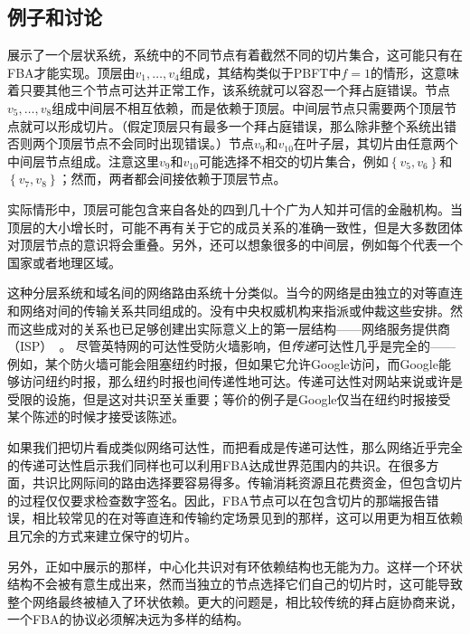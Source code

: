 \subsection{例子和讨论}\label{sec:fba_eg_disscuss}
展示了一个层状系统，系统中的不同节点有着截然不同的切片集合，这可能只有在FBA才能实现。顶层由$v_1,\ldots,v_4$组成，其结构类似于PBFT中$f=1$的情形，这意味着只要其他三个节点可达并正常工作，该系统就可以容忍一个拜占庭错误。节点$v_5,\ldots,v_8$组成中间层不相互依赖，而是依赖于顶层。中间层节点只需要两个顶层节点就可以形成切片。（假定顶层只有最多一个拜占庭错误，那么除非整个系统出错否则两个顶层节点不会同时出现错误。）节点$v_9$和$v_{10}$在叶子层，其切片由任意两个中间层节点组成。注意这里$v_9$和$v_{10}$可能选择不相交的切片集合，例如$\left\{v_5,v_6\right\}$和$\left\{v_7,v_8\right\}$；然而，两者都会间接依赖于顶层节点。

实际情形中，顶层可能包含来自各处的四到几十个广为人知并可信的金融机构。当顶层的大小增长时，可能不再有关于它的成员关系的准确一致性，但是大多数团体对顶层节点的意识将会重叠。另外，还可以想象很多的中间层，例如每个代表一个国家或者地理区域。

这种分层系统和域名间的网络路由系统十分类似。当今的网络是由独立的对等直连和网络对间的传输关系共同组成的。没有中央权威机构来指派或仲裁这些安排。然而这些成对的关系也已足够创建出实际意义上的第一层结构——网络服务提供商（ISP）~\cite{peer_isp2010}。	尽管英特网的可达性受防火墙影响，但\textit{传递}可达性几乎是完全的——例如，某个防火墙可能会阻塞纽约时报，但如果它允许Google访问，而Google能够访问纽约时报，那么纽约时报也间传递性地可达。传递可达性对网站来说或许是受限的设施，但是这对共识至关重要；等价的例子是Google仅当在纽约时报接受某个陈述的时候才接受该陈述。

如果我们把{\quorum}切片看成类似网络可达性，而把{\quorum}看成是传递可达性，那么网络近乎完全的传递可达性启示我们同样也可以利用FBA达成世界范围内的共识。在很多方面，共识比网际间的路由选择要容易得多。传输消耗资源且花费资金，但包含切片的过程仅仅要求检查数字签名。因此，FBA节点可以在包含切片的那端报告错误，相比较常见的在对等直连和传输约定场景见到的那样，这可以用更为相互依赖且冗余的方式来建立保守的切片。

另外，正如中展示的那样，中心化共识对有环依赖结构也无能为力。这样一个环状结构不会被有意生成出来，然而当独立的节点选择它们自己的切片时，这可能导致整个网络最终被植入了环状依赖。更大的问题是，相比较传统的拜占庭协商来说，一个FBA的协议必须解决远为多样的{\quorum}结构。